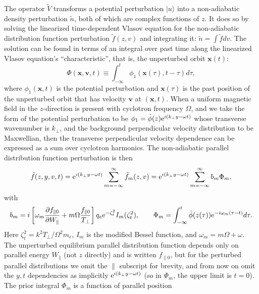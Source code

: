 \documentclass[12pt]{article}
\def\ket#1{|#1\rangle}
\def\etothe#1{{\rm e}^{#1}}
\begin{document}
The operator $\tilde{V}$ transforms a potential perturbation $\ket{u}$
into a non-adiabatic density perturbation $\tilde n$, both of which
are complex functions of $z$. It does so by solving the linearized
time-dependent Vlasov equation for the non-adiabatic distribution
function perturbation $\tilde f(z,v)$ and integrating it:
$\tilde n =\int \tilde f dv$. The solution can be found in terms
of an integral over past time along the linearized Vlasov equation's
``characteristic'', that is, the unperturbed orbit $\bm x(t)$:
\begin{equation}
  \label{eq:phim}
  \Phi(\bm x,\bm v,t)\equiv 
  \int_{-\infty}^t \phi_1(\bm x(\tau),t-\tau ) d\tau,
\end{equation}
where $\phi_1(\bm x,t)$ is the potential perturbation and
$\bm x(\tau)$ is the past position of the unperturbed orbit
that has velocity $\bm v$ at $(\bm x,t)$.  When a uniform magnetic
field in the $z$-direction is present with cyclotron frequency
$\Omega$, and we take the form of the potential perturbation to be
$\phi_1=\hat\phi(z){\rm e}^{i(k_\perp y-\omega t)}$ whose transverse
wavenumber is $k_\perp$, and the background perpendicular velocity
distribution to be Maxwellian, then the transverse perpendicular velocity
dependence can be expressed as a sum over cyclotron harmonics\cite{Hutchinson2018a}.
The non-adiabatic parallel distribution function perturbation is then
\begin{equation}\label{eq:ftmagnetic}
    \tilde f(z,y,v,t) = {\rm e}^{i(k_\perp y-\omega t)}
    \sum_{m=-\infty}^\infty \tilde f_m(z,v)= {\rm e}^{i(k_\perp
      y-\omega t)} \sum_{m=-\infty}^\infty b_m \Phi_m,
\end{equation}
with
\begin{equation}
  \label{mweight}
   b_m=i\left[\omega_m
  {\partial f_{\parallel0}\over \partial W_\parallel}
  +m\Omega {f_{\parallel0}\over T_\perp}\right]
q_e{\rm e}^{-\zeta_t^2}I_m(\zeta_t^2),\qquad
\Phi_m=\int_{-\infty}^t \hat\phi(z(\tau))\etothe{-i\omega_m(\tau-t)}d\tau.
\end{equation}
Here $\zeta_t^2=k^2T_\perp/\Omega^2m_e$, $I_m$ is the modified Bessel
function, and $\omega_m=m\Omega+\omega$. The unperturbed equilibrium
parallel distribution function depends only on parallel energy $W_\parallel$
(not $z$ directly) and is written $f_{\parallel 0}$, but for the
perturbed parallel distributions we omit the $\parallel$ subscript for
brevity, and from now on omit the $y,t$ dependencies as implicitly
$ {\rm e}^{i(k_\perp y-\omega t)}$ (so in $\Phi_m$, the upper limit is
$t=0$). The prior integral $\Phi_m$ is a function of parallel position
\end{document}
